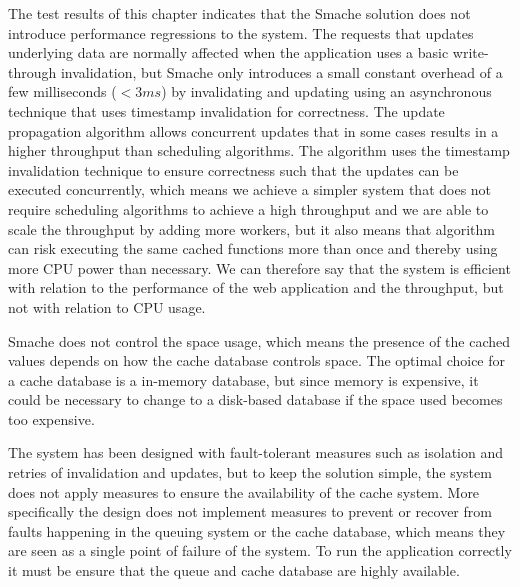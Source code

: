 The test results of this chapter indicates that the Smache solution does not introduce performance regressions to the system. The requests that updates underlying data are normally affected when the application uses a basic write-through invalidation, but Smache only introduces a small constant overhead of a few milliseconds ($< 3 ms$) by invalidating and updating using an asynchronous technique that uses timestamp invalidation for correctness. The update propagation algorithm allows concurrent updates that in some cases results in a higher throughput than scheduling algorithms. The algorithm uses the timestamp invalidation technique to ensure correctness such that the updates can be executed concurrently, which means we achieve a simpler system that does not require scheduling algorithms to achieve a high throughput and we are able to scale the throughput by adding more workers, but it also means that algorithm can risk executing the same cached functions more than once and thereby using more CPU power than necessary. We can therefore say that the system is efficient with relation to the performance of the web application and the throughput, but not with relation to CPU usage.

Smache does not control the space usage, which means the presence of the cached values depends on how the cache database controls space. The optimal choice for a cache database is a in-memory database, but since memory is expensive, it could be necessary to change to a disk-based database if the space used becomes too expensive.

The system has been designed with fault-tolerant measures such as isolation and retries of invalidation and updates, but to keep the solution simple, the system does not apply measures to ensure the availability of the cache system. More specifically the design does not implement measures to prevent or recover from faults happening in the queuing system or the cache database, which means they are seen as a single point of failure of the system. To run the application correctly it must be ensure that the queue and cache database are highly available.


